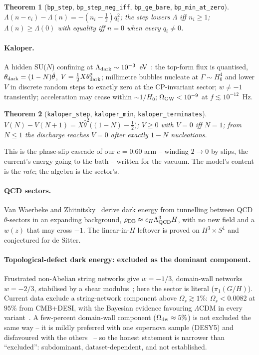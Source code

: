 \documentclass[11pt,a4paper]{article}
\newcommand{\lean}[1]{\texttt{\small #1}}
\newtheorem{theorem}{Theorem}
\begin{document}
\begin{theorem}[\lean{bp\_step}, \lean{bp\_step\_neg\_iff}, \lean{bp\_ge\_bare}, \lean{bp\_min\_at\_zero}]
$\Lambda(n-e_i)-\Lambda(n)=-(n_i-\tfrac12)q_i^2$; the step lowers $\Lambda$ iff $n_i\ge1$; $\Lambda(n)\ge
\Lambda(0)$ with equality iff $n=0$ when every $q_i\neq0$.
\end{theorem}

\paragraph{Kaloper.} A hidden SU($N$) confining at $\Lambda_{\rm dark}\sim10^{-3}$~eV~\cite{Kaloper2025}: the
top-form flux is quantised, $\theta_{\rm dark}=(1-N)\hat\theta$, $V=\tfrac12X\theta_{\rm dark}^2$; millimetre
bubbles nucleate at $\Gamma\sim H_0^4$ and lower $V$ in discrete random steps to exactly zero at the CP-invariant
sector; $w\neq-1$ transiently; acceleration may cease within $\sim1/H_0$; $\Omega_{\rm GW}<10^{-9}$ at
$f\lesssim10^{-12}$~Hz.

\begin{theorem}[\lean{kaloper\_step}, \lean{kaloper\_min}, \lean{kaloper\_terminates}]
$V(N)-V(N+1)=X\hat\theta^2\big((1-N)-\tfrac12\big)$; $V\ge0$ with $V=0$ iff $N=1$; from $N\le1$ the discharge
reaches $V=0$ after exactly $1-N$ nucleations.
\end{theorem}
This is the phase-slip cascade of our $e=0.60$ arm -- winding $2\to0$ by slips, the current's energy going to
the bath -- written for the vacuum. The model's content is the \emph{rate}; the algebra is the sector's.

\paragraph{QCD sectors.} Van Waerbeke and Zhitnitsky~\cite{VanWaerbekeZhitnitsky2025} derive dark energy from
tunnelling between QCD $\theta$-sectors in an expanding background, $\rho_{\rm DE}\approx c_H\Lambda_{\rm
QCD}^3H$, with no new field and a $w(z)$ that may cross $-1$. The linear-in-$H$ leftover is proved on
$H^3\times S^1$ and conjectured for de Sitter.

\paragraph{Topological-defect dark energy: excluded as the dominant component.} Frustrated non-Abelian string
networks give $w=-1/3$, domain-wall networks $w=-2/3$, stabilised by a shear
modulus~\cite{BucherSpergel1999,Vilenkin1984,Kibble1976}; here the sector is literal ($\pi_1(G/H)$). Current data
exclude a string-network component above $\Omega_s\gtrsim1\%$: $\Omega_s<0.0082$ at $95\%$ from CMB+DESI, with
the Bayesian evidence favouring $\Lambda$CDM in every variant~\cite{ChengDiValentinoVisinelli2025}. A few-percent
domain-wall component ($\Omega_{\rm dw}\approx5\%$) is not excluded the same way -- it is mildly preferred with
one supernova sample (DESY5) and disfavoured with the others~\cite{AnHanZhang2026} -- so the honest statement is
narrower than ``excluded'': subdominant, dataset-dependent, and not established.
\end{document}
